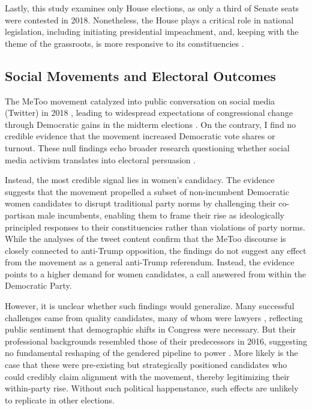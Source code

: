 \documentclass[manuscript,screen,nonacm,11pt,acm]{acmart}
\begin{document}
Lastly, this study examines only House elections, as only a third of Senate seats were contested in 2018.
Nonetheless, the House plays a critical role in national legislation, including initiating presidential impeachment, and, keeping with the theme of the grassroots, is more responsive to its constituencies \citep[e.g.,][]{wholeads2019}.

\subsection{Social Movements and Electoral Outcomes}
The MeToo movement catalyzed into public conversation on social media (Twitter) in 2018 \citep{goenaga2021}, leading to widespread expectations of congressional change through Democratic gains in the midterm elections \citep{genderwatch2018, telegraphMetoo, thomsen2020, tippett2018-bi}.
On the contrary, I find no credible evidence that the movement increased Democratic vote shares or turnout.
These null findings echo broader research questioning whether social media activism translates into electoral persuasion \citep{cs}.

Instead, the most credible signal lies in women's candidacy.
The evidence suggests that the movement propelled a subset of non-incumbent Democratic women candidates to disrupt traditional party norms by challenging their co-partisan male incumbents, enabling them to frame their rise as ideologically principled responses to their constituencies \citep{wholeads2019} rather than violations of party norms.
While the analyses of the tweet content confirm that the MeToo discourse is closely connected to anti-Trump opposition, the findings do not suggest any effect from the movement as a general anti-Trump referendum.
Instead, the evidence points to a higher demand for women candidates, a call answered from within the Democratic Party.

However, it is unclear whether such findings would generalize.
Many successful challenges came from quality candidates, many of whom were lawyers \citep{thomsen2020}, reflecting public sentiment that demographic shifts in Congress were necessary.
But their professional backgrounds resembled those of their predecessors in 2016, suggesting no fundamental reshaping of the gendered pipeline to power \citep{thomsen2020}.
More likely is the case that these were pre-existing but strategically positioned candidates who could credibly claim alignment with the movement, thereby legitimizing their within-party rise.
Without such political happenstance, such effects are unlikely to replicate in other elections.
\end{document}
